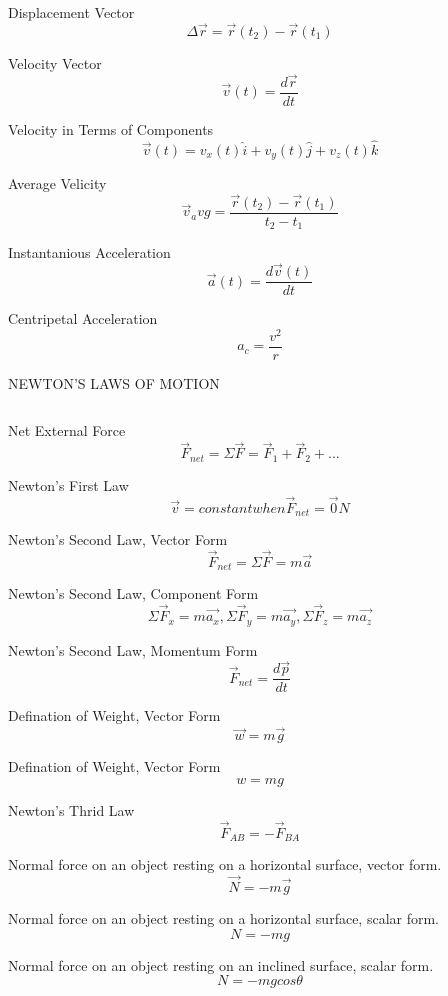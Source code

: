 \documentclass[12pt, letterpaper, twoside]{article}
\begin{document}
Displacement Vector
$$\Delta \overrightarrow{r}=\overrightarrow{r}(t_2) -  \overrightarrow{r}(t_1)$$


Velocity Vector
$$\overrightarrow{v}(t)= \frac{d \overrightarrow{r}}{dt}$$


Velocity in Terms of Components
$$\overrightarrow{v}(t) = v_x(t) \hat{i} + v_y(t) \hat{j} + v_z(t) \hat{k}$$


Average Velicity
$$\overrightarrow{v}_avg = \frac{\overrightarrow{r}(t_2) -  \overrightarrow{r}(t_1)}{t_2 - t_1}$$


Instantanious Acceleration
$$\overrightarrow{a}(t)= \frac{d \overrightarrow{v}(t)}{dt}$$


Centripetal Acceleration
$$a_c = \frac{v^2}{r}$$



\newpage

NEWTON'S LAWS OF MOTION

$$ $$


Net External Force
$$\overrightarrow{F}_{net} = \Sigma \overrightarrow{F} = \overrightarrow{F}_1+\overrightarrow{F}_2 +...$$


Newton's First Law
$$\overrightarrow{v} = constant when \overrightarrow{F}_{net} = \overrightarrow{0} N$$


Newton's Second Law, Vector Form
$$\overrightarrow{F}_{net} = \Sigma \overrightarrow{F} = m \overrightarrow{a}$$


Newton's Second Law, Component Form
$$\Sigma \overrightarrow{F}_x = m \overrightarrow{a_x}, \Sigma \overrightarrow{F}_y = m \overrightarrow{a_y},\Sigma \overrightarrow{F}_z = m \overrightarrow{a_z}$$



Newton's Second Law, Momentum Form
$$\overrightarrow{F}_{net} = \frac{d \overrightarrow{p}}{dt}$$


Defination of Weight, Vector Form
$$\overrightarrow{w} = m \overrightarrow{g}$$


Defination of Weight, Vector Form
$$w = mg$$


Newton's Thrid Law
$$\overrightarrow{F}_{AB} = - \overrightarrow{F}_{BA}$$

Normal force on an object resting on a horizontal surface,
vector form.
$$\overrightarrow{N} = -m \overrightarrow{g}$$

Normal force on an object resting on a horizontal surface,
scalar form.
$$N = -mg$$

Normal force on an object resting on an inclined surface,
scalar form.
$$N = -m g cos \theta$$
\end{document}
